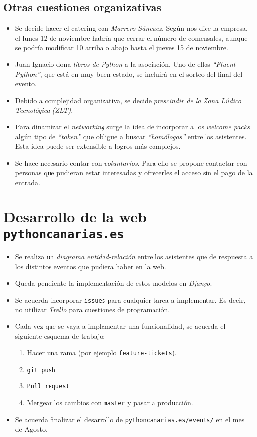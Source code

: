 \documentclass[a4paper, 12pt]{article}
\begin{document}
    \subsection*{Otras cuestiones organizativas}

    \begin{itemize}
        \item Se decide hacer el catering con \textit{Marrero Sánchez}. Según nos dice la empresa, el lunes 12 de noviembre habría que cerrar el número de comensales, aunque se podría modificar 10 arriba o abajo hasta el jueves 15 de noviembre.
        \item Juan Ignacio dona \textit{libros de Python} a la asociación. Uno de ellos \textit{``Fluent Python''}, que está en muy buen estado, se incluirá en el sorteo del final del evento.
        \item Debido a complejidad organizativa, se decide \textit{prescindir de la Zona Lúdico Tecnológica (ZLT)}.
        \item Para dinamizar el \textit{networking} surge la idea de incorporar a los \textit{welcome packs} algún tipo de \textit{``token''} que obligue a buscar \textit{``homólogos''} entre los asistentes. Esta idea puede ser extensible a logros más complejos.
        \item Se hace necesario contar con \textit{voluntarios}. Para ello se propone contactar con personas que pudieran estar interesadas y ofrecerles el acceso sin el pago de la entrada.
    \end{itemize}

    \section{Desarrollo de la web \texttt{pythoncanarias.es}}

    \begin{itemize}
        \item Se realiza un \textit{diagrama entidad-relación} entre los asistentes que de respuesta a los distintos eventos que pudiera haber en la web.
        \item Queda pendiente la implementación de estos modelos en \textit{Django}.
        \item Se acuerda incorporar \texttt{issues} para cualquier tarea a implementar. Es decir, no utilizar \textit{Trello} para cuestiones de programación.
        \item Cada vez que se vaya a implementar una funcionalidad, se acuerda el siguiente esquema de trabajo:
        \begin{enumerate}
            \item Hacer una rama (por ejemplo \texttt{feature-tickets}).
            \item \texttt{git push}
            \item \texttt{Pull request}
            \item Mergear los cambios con \texttt{master} y pasar a producción.
        \end{enumerate}
        \item Se acuerda finalizar el desarrollo de \texttt{pythoncanarias.es/events/} en el mes de Agosto.
    \end{itemize}
    
\end{document}
